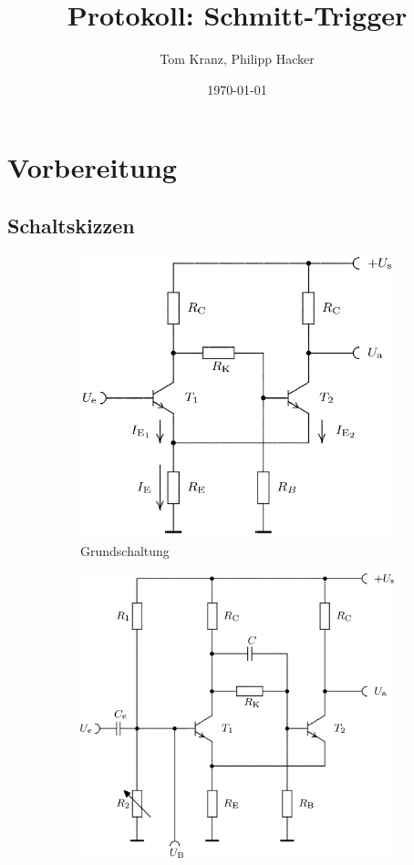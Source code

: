 \documentclass[numbers=noenddot,12pt,a4paper]{scrartcl}
\title{Protokoll: Schmitt-Trigger}
\author{Tom Kranz, Philipp Hacker}
\date{\today}
\begin{document}
\maketitle
\vspace*{\fill}
\tableofcontents
\vfill
\newpage
\section{Vorbereitung}
\subsection{Schaltskizzen}
\begin{figure}[H]
\centering
\begin{subfigure}[b]{0.49\textwidth}
\includegraphics[width=\textwidth]{schaltskizze_st2.png}
\caption{Grundschaltung}
\label{img:grund}
\end{subfigure}
\begin{subfigure}[b]{0.49\textwidth}
\includegraphics[width=\textwidth]{schaltskizze_st1.png}

\end{subfigure}
\end{figure}
\end{document}
